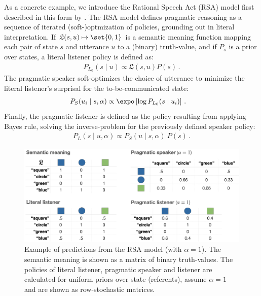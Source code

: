\documentclass[fleqn]{article}
\begin{document}
As a concrete example, we introduce the Rational Speech Act (RSA) model first described in this form by \citet{FrankGoodman2012:Predicting-Prag} \citep[for overview see][]{FrankeJager2015:Probabilistic-p,GoodmanFrank2016:Pragmatic-Langu,StevensBenz2018:Game-Theoretic-,ScontrasTessler2021:A-practical-int,Degen2023:The-Rational-Sp}.
The RSA model defines pragmatic reasoning as a sequence of iterated (soft-)optmization of policies, grounding out in literal interpretation.
If $\mathfrak{L}(s,u) \mapsto \set{0,1}$ is a semantic meaning function mapping each pair of state $s$ and utterance $u$ to a (binary) truth-value, and if $P_{s}$ is a prior over states, a literal listener policy is defined as:
%
\begin{align*}
 P_{L_{0}}(s \mid u) \propto \mathfrak{L}(s,u) P(s)\,.
\end{align*}
%
The pragmatic speaker soft-optimizes the choice of utterance to minimize the literal listener's surprisal for the to-be-communicated state:
%
\begin{align*}
  P_{S}(u_{i} \mid s, \alpha) & \propto \expo \left [ \log P_{L_{0}}(s \mid u_{i}) \right ] \,.
\end{align*}
%
Finally, the pragmatic listener is defined as the policy resulting from applying Bayes rule, solving the inverse-problem for the previously defined speaker policy:
%
\begin{align*}
  P_{L}(s \mid u, \alpha) \propto  P_{S}(u \mid s, \alpha) \  P(s) \,.
\end{align*}

\begin{figure}[t]
  \centering
  \includegraphics[width = 0.9 \textwidth]{00-pics/RSA-example.png}
  \caption{
    Example of predictions from the RSA model (with $\alpha=1$).
    The semantic meaning is shown as a matrix of binary truth-values.
    The policies of literal listener, pragmatic speaker and listener are calculated for uniform priors over state (referents), assume $\alpha=1$ and are shown as row-stochastic matrices.
  }
  \label{fig:RSA-example}
\end{figure}
\end{document}
